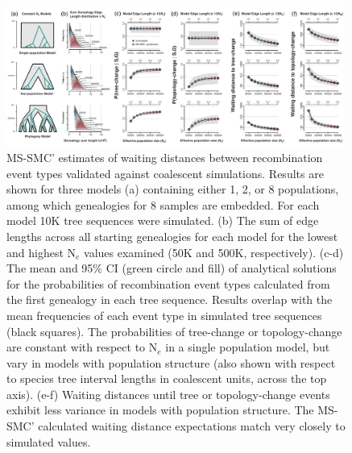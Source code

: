 \documentclass[11pt]{article}
\begin{document}
\begin{figure}[t]
	\centering
	\includegraphics[width=0.99\textwidth]{figures/Fig4-final-validation4.pdf}
	\caption{
		MS-SMC' estimates of waiting distances between recombination
		event types validated against coalescent simulations. Results are 
		shown for three models (a) containing either 1, 2, or 8 populations,
		among which genealogies for 8 samples are embedded. For each model
		10K tree sequences were simulated. 
		(b) The sum of edge lengths across all starting genealogies for each 
		model for the lowest and highest N$_e$ values examined 
		(50K and 500K, respectively).
		(c-d) The mean and 95\% CI (green circle and fill) of analytical
		solutions for the probabilities of recombination event types calculated
		from the first genealogy in each tree sequence. Results overlap 
		with the mean frequencies of each event type in simulated tree 
		sequences (black squares).
		The probabilities of tree-change or topology-change are 
		constant with respect to N$_e$ in a single population model, 
		but vary in models with population structure (also shown with respect to 
		species tree interval lengths in coalescent units, across the top axis). 
		(e-f) Waiting distances until tree or topology-change events exhibit 
		less variance in models with population structure. The MS-SMC' calculated 
		waiting distance expectations match very closely to simulated values.
	}
	\label{fig:fig-validation}
\end{figure}
\end{document}
